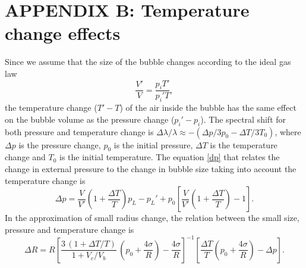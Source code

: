 \documentclass[a4paper,12pt]{article}
\begin{document}
	\section*{APPENDIX B: Temperature change effects}
Since we assume that the size of the bubble changes according to the ideal gas law
\begin{equation}
    \frac{V'}{V}=\frac{p_iT'}{p_i'T},
\end{equation}
the temperature change ($T'-T$) of the air inside the bubble has the same effect on the bubble volume as the pressure change ($p_i'-p_i$).
The spectral shift for both pressure and temperature change is $\Delta \lambda/\lambda \approx - ( \Delta p/ 3 p_0 - \Delta T/ 3 T_0)$, where $\Delta p$ is the pressure change, $p_0$ is the initial pressure, $\Delta T$ is the temperature change and $T_0$ is the initial temperature.
The equation \eqref{dp} that relates the change in external pressure to the change in bubble size taking into account the temperature change is 
\begin{equation}
	\Delta p = \frac{V}{V'}{\left(1+\frac{\Delta T}{T}\right)}p_L - p_L' + p_0\left[\frac{V}{V'}{\left(1+\frac{\Delta T}{T}\right)}-1\right]. 
	\end{equation}
 In the approximation of small radius change, the relation between the small size, pressure and temperature change is
 \begin{equation}
	\Delta R= R\left[\frac{3\,(1+\Delta T/T)}{1+V_c/V_b}\,\left(p_0+\frac{4\sigma}{R}\right) - \frac{4\sigma}{R}\right]^{-1}\left[\frac{\Delta T}{T}\left(p_0+\frac{4\sigma}{R}\right)-\Delta p\right].
	\end{equation}
 
\end{document}
